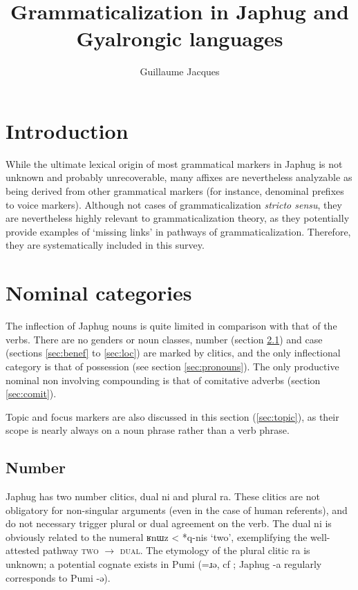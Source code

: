 \documentclass[oldfontcommands,oneside,a4paper,11pt]{article}
\newcommand{\ipa}[1]{\mbox{\phon #1}} %
\begin{document}
 
 \title{Grammaticalization in Japhug and Gyalrongic languages}
 \author{Guillaume Jacques}
 \maketitle  
 \section{Introduction}

While the ultimate lexical origin of most grammatical markers in Japhug is not unknown and probably unrecoverable, many affixes are nevertheless analyzable as being derived from other grammatical markers (for instance, denominal prefixes to voice markers). Although not cases of grammaticalization \textit{stricto sensu}, they are nevertheless  highly relevant to grammaticalization theory, as they potentially provide examples of `missing links' in pathways of grammaticalization. Therefore, they are systematically included in this survey.

 \section{Nominal categories} 
 
The inflection of Japhug nouns is quite limited in comparison with that of the verbs. There are no genders or noun classes, number (section \ref{sec:number}) and case (sections \ref{sec:benef} to \ref{sec:loc}) are marked by clitics, and the only inflectional category is that of possession (see section \ref{sec:pronouns}).  The only productive nominal non involving compounding is that of comitative adverbs (section \ref{sec:comit}).

Topic and focus markers are also discussed in this section (\ref{sec:topic}), as their scope is nearly always on a noun phrase rather than a verb phrase.

\subsection{Number} \label{sec:number}

Japhug has two number clitics, dual \ipa{ni} and plural \ipa{ra}. These clitics are not obligatory for non-singular arguments (even in the case of human referents), and do not necessary trigger plural or dual agreement on the verb. The dual \ipa{ni} is obviously related to the numeral \ipa{ʁnɯz} < *\ipa{q-nis} `two', exemplifying the well-attested pathway \textsc{two} $\rightarrow$ \textsc{dual}. The etymology of the plural clitic \ipa{ra} is unknown; a potential cognate exists in Pumi (\ipa{=ɹə}, cf \citealt[135]{daudey14grammar}; Japhug \ipa{-a} regularly corresponds to Pumi \ipa{-ə}).
 
\end{document}
